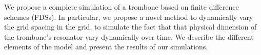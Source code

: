 We propose a complete simulation of a trombone based on finite difference schemes (FDSs). In particular, we propose a novel method to dynamically vary the grid spacing in the grid, to simulate the fact that that physical dimension of the trombone's resonator vary dynamically over time.
We describe the different elements of the model and present the results of our simulations.